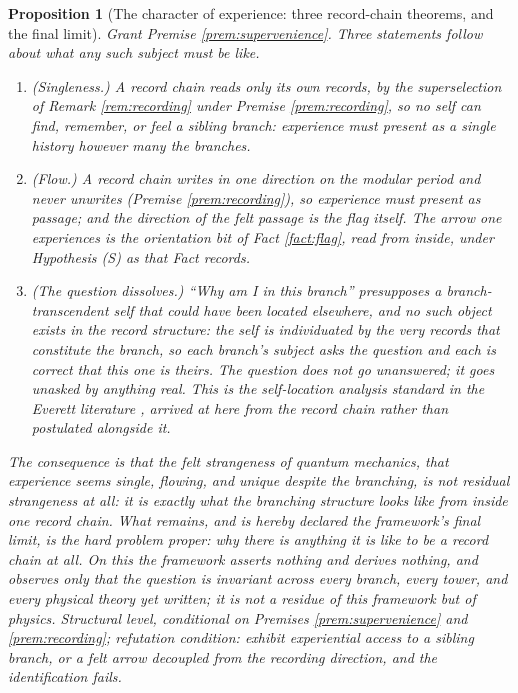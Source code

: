 \documentclass[11pt]{article}
\newtheorem{proposition}[theorem]{Proposition}
\theoremstyle{definition}
\begin{document}
\begin{proposition}[The character of experience: three record-chain theorems, and the final limit]\label{prop:experience}
Grant Premise \ref{prem:supervenience}. Three statements follow about what any such subject must be like.
\begin{enumerate}
\item \emph{(Singleness.)} A record chain reads only its own records, by the superselection of Remark \ref{rem:recording} under Premise \ref{prem:recording}, so no self can find, remember, or feel a sibling branch: experience must present as a single history however many the branches.
\item \emph{(Flow.)} A record chain writes in one direction on the modular period and never unwrites (Premise \ref{prem:recording}), so experience must present as passage; and the direction of the felt passage is the flag itself. The arrow one experiences is the orientation bit of Fact \ref{fact:flag}, read from inside, under Hypothesis (S) as that Fact records.
\item \emph{(The question dissolves.)} ``Why am I in this branch'' presupposes a branch-transcendent self that could have been located elsewhere, and no such object exists in the record structure: the self is individuated by the very records that constitute the branch, so each branch's subject asks the question and each is correct that this one is theirs. The question does not go unanswered; it goes unasked by anything real. This is the self-location analysis standard in the Everett literature \cite{Saunders2010, Wallace2012}, arrived at here from the record chain rather than postulated alongside it.
\end{enumerate}
The consequence is that the felt strangeness of quantum mechanics, that experience seems single, flowing, and unique despite the branching, is not residual strangeness at all: it is exactly what the branching structure looks like from inside one record chain. What remains, and is hereby declared the framework's final limit, is the hard problem proper: why there is anything it is like to be a record chain at all. On this the framework asserts nothing and derives nothing, and observes only that the question is invariant across every branch, every tower, and every physical theory yet written; it is not a residue of this framework but of physics. Structural level, conditional on Premises \ref{prem:supervenience} and \ref{prem:recording}; refutation condition: exhibit experiential access to a sibling branch, or a felt arrow decoupled from the recording direction, and the identification fails.
\end{proposition}
\end{document}

